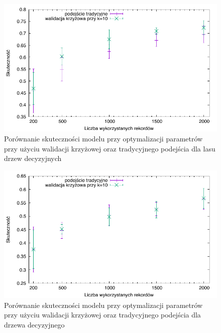 \begin{figure}
\centering
\includegraphics[scale=\cvsize]{res/cv_forest.pdf}
\caption[Caption for LOF]{Porównanie skuteczności modelu przy optymalizacji parametrów przy użyciu walidacji krzyżowej oraz tradycyjnego podejścia dla lasu drzew decyzyjnych\label{cv_forest}}
\end{figure}

\begin{figure}
\centering
\includegraphics[scale=\cvsize]{res/cv_tree.pdf}
\caption[Caption for LOF]{Porównanie skuteczności modelu przy optymalizacji parametrów przy użyciu walidacji krzyżowej oraz tradycyjnego podejścia dla drzewa decyzyjnego\label{cv_tree}}
\end{figure}
  


